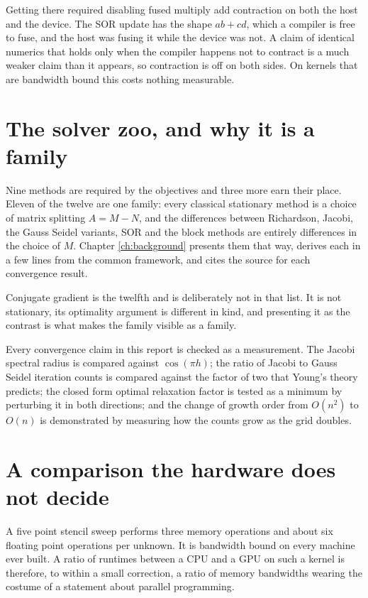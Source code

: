 Getting there required disabling fused multiply add contraction on both the host
and the device. The SOR update has the shape $ab + cd$, which a compiler is free
to fuse, and the host was fusing it while the device was not. A claim of
identical numerics that holds only when the compiler happens not to contract is
a much weaker claim than it appears, so contraction is off on both sides. On
kernels that are bandwidth bound this costs nothing measurable.

\section{The solver zoo, and why it is a family}

Nine methods are required by the objectives and three more earn their place.
Eleven of the twelve are one family: every classical stationary method is a
choice of matrix splitting $A = M - N$, and the differences between Richardson,
Jacobi, the Gauss Seidel variants, SOR and the block methods are entirely
differences in the choice of $M$. Chapter \ref{ch:background} presents them that
way, derives each in a few lines from the common framework, and cites the source
for each convergence result.

Conjugate gradient is the twelfth and is deliberately not in that list. It is
not stationary, its optimality argument is different in kind, and presenting it
as the contrast is what makes the family visible as a family.

Every convergence claim in this report is checked as a measurement. The Jacobi
spectral radius is compared against $\cos(\pi h)$; the ratio of Jacobi to
Gauss Seidel iteration counts is compared against the factor of two that Young's
theory predicts; the closed form optimal relaxation factor is tested as a
minimum by perturbing it in both directions; and the change of growth order from
$O(n^2)$ to $O(n)$ is demonstrated by measuring how the counts grow as the grid
doubles.

\section{A comparison the hardware does not decide}

A five point stencil sweep performs three memory operations and about six
floating point operations per unknown. It is bandwidth bound on every machine
ever built. A ratio of runtimes between a CPU and a GPU on such a kernel is
therefore, to within a small correction, a ratio of memory bandwidths wearing
the costume of a statement about parallel programming.

